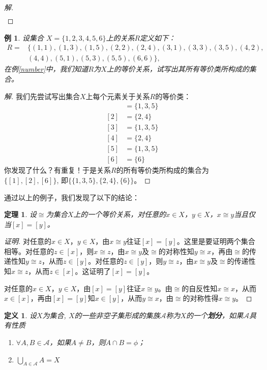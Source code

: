 \documentclass{article}
\newtheorem{Def}{定义}
\newtheorem{Thm}{定理}
\newtheorem{Example}{例}
\begin{document}
\begin{CJK*}{UTF8}{gbsn}
\begin{proof}[解]
\begin{align*}
    \end{align*}
  \end{proof}
  \begin{Example}
    设集合
    $X=\{1,2,3,4,5,6 \}$上的关系$R$定义如下：
    \begin{align*}
      R=&\{(1,1),(1,3),(1,5),(2,2),(2,4),(3,1),(3,3),(3,5),(4,2),\\
      &(4,4),(5,1),(5,3),(5,5),(6,6)\},
    \end{align*}
      在例\ref{number}中，我们知道$R$为$X$上的等价关系，试写出其所有等价类所构成的集合。
    \end{Example}
    \begin{proof}[解]
      我们先尝试写出集合$X$上每个元素关于关系$R$的等价类：
      \begin{align*}
        [1]&=\{1,3,5\}\\
        [2]&=\{2,4\}\\
        [3]&=\{1,3,5\}\\
        [4]&=\{2,4\}\\
        [5]&=\{1,3,5\}\\
        [6]&=\{6\}
      \end{align*}
      你发现了什么？有重复！于是关系$R$的所有等价类所构成的集合为$\{[1],[2],[6]\}$, 即$\{\{1,3,5\},\{2,4\},\{6\}\}$。
    \end{proof}
    通过以上的例子，我们发现了以下的结论：
    \begin{Thm}
      设$\cong$为集合$X$上的一个等价关系，对任意的$x\in X$，$y\in X$，$x\cong y$当且仅当$[x]=[y]$。
    \end{Thm}
    \begin{proof}[证明]

      对任意的$x\in X$，$y\in X$，由$x\cong y$往证$[x]=[y]$。这里是要证明两个集合相等。对任意的$z\in [x]$，则$x\cong z$，由$x\cong y$及$\cong$的对称性知$y\cong x$，再由$\cong$的传递性知$y\cong z$，从而$z\in [y]$。对任意的$z\in [y]$，则$y\cong z$，由$x\cong y$及$\cong$的传递性知$x\cong z$，从而$z\in [x]$。这证明了$[x]=[y]$。

      对任意的$x\in X$，$y\in X$，由$[x]=[y]$往证$x\cong y$。由$\cong$的自反性知$x\cong x$，从而$x\in [x]$，再由$[x]=[y]$知$x\in [y]$，从而$y\cong x$，由$\cong$的对称性得$x\cong y$。
    \end{proof}
   \begin{Def}
    设$X$为集合, $X$的一些非空子集形成的集族$\mathscr{A}$称为$X$的一个{\bfseries 划分}，如果$\mathscr{A}$具有性质
    \begin{enumerate}
    \item $\forall A, B \in \mathscr{A}$，如果$A \neq B$，则$A \cap B = \phi$；
      \item $\bigcup_{A \in \mathscr{A}} A= X$
    \end{enumerate}
  \end{Def}


\end{CJK*}
\end{document}
